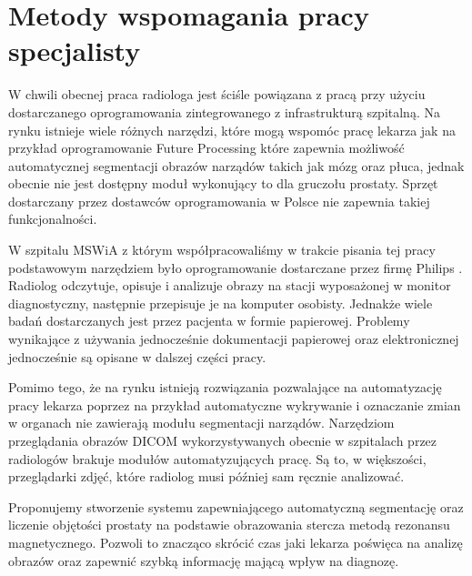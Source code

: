 \documentclass[a4paper,11pt,twoside]{report}
\theoremstyle{definition}
\begin{document}
\section{Metody wspomagania pracy specjalisty}
W chwili obecnej praca radiologa jest ściśle powiązana z pracą przy użyciu dostarczanego oprogramowania zintegrowanego z infrastrukturą szpitalną. Na rynku istnieje wiele różnych narzędzi, które mogą wspomóc pracę lekarza jak na przykład oprogramowanie Future Processing \cite{FP} które zapewnia możliwość automatycznej segmentacji obrazów narządów takich jak mózg oraz płuca, jednak obecnie nie jest dostępny moduł wykonujący to dla gruczołu prostaty. Sprzęt dostarczany przez dostawców oprogramowania w Polsce nie zapewnia takiej funkcjonalności.
\par
W szpitalu MSWiA z którym współpracowaliśmy w trakcie pisania tej pracy podstawowym narzędziem było oprogramowanie dostarczane przez firmę Philips \cite{Philips}. Radiolog odczytuje, opisuje i analizuje obrazy na stacji wyposażonej w monitor diagnostyczny, następnie przepisuje je na komputer osobisty. Jednakże wiele badań dostarczanych jest przez pacjenta w formie papierowej. Problemy wynikające z używania jednocześnie dokumentacji papierowej oraz elektronicznej jednocześnie są opisane w dalszej części pracy.
\par
Pomimo tego, że na rynku istnieją rozwiązania pozwalające na automatyzację pracy lekarza poprzez na przykład automatyczne wykrywanie i oznaczanie zmian w organach nie zawierają modułu segmentacji narządów. Narzędziom przeglądania obrazów DICOM wykorzystywanych obecnie w szpitalach przez radiologów brakuje modułów automatyzujących pracę. Są to, w większości, przeglądarki zdjęć, które radiolog musi później sam ręcznie analizować. 
\par
Proponujemy stworzenie systemu zapewniającego automatyczną segmentację oraz liczenie objętości prostaty na podstawie obrazowania stercza metodą rezonansu magnetycznego. Pozwoli to znacząco skrócić czas jaki lekarza poświęca na analizę obrazów oraz zapewnić szybką informację mającą wpływ na diagnozę.
\end{document}
